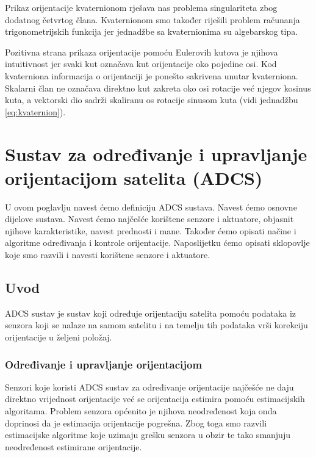 \documentclass[times, utf8, diplomski, numeric]{templates/template}
\begin{document}
{{        Prikaz orijentacije kvaternionom rješava nas problema singulariteta zbog dodatnog četvrtog člana. Kvaternionom smo također riješili problem računanja trigonometrijskih funkcija jer jednadžbe sa kvaternionima su algebarskog tipa.

        Pozitivna strana prikaza orijentacije pomoću Eulerovih kutova je njihova intuitivnost jer svaki kut označava kut orijentacije oko pojedine osi. Kod kvaterniona informacija o orijentaciji je ponešto sakrivena unutar kvaterniona. Skalarni član ne označava direktno kut zakreta oko osi rotacije već njegov kosinus kuta, a vektorski dio sadrži skaliranu os rotacije sinusom kuta (vidi jednadžbu \ref{eq:kvaternion}).
    }
}

\chapter{Sustav za određivanje i upravljanje orijentacijom satelita (ADCS)}{
    U ovom poglavlju navest ćemo definiciju ADCS  sustava. Navest ćemo osnovne dijelove sustava. Navest ćemo najčešće korištene senzore i aktuatore, objasnit njihove karakteristike, navest prednosti i mane. Također ćemo opisati načine i algoritme određivanja i kontrole orijentacije. Naposlijetku ćemo opisati sklopovlje koje smo razvili i navesti korištene senzore i aktuatore. 

    \section{Uvod}{
        ADCS  sustav je sustav koji određuje orijentaciju satelita pomoću podataka iz senzora koji se nalaze na samom satelitu i na temelju tih podataka vrši korekciju orijentacije u željeni položaj. 

        \subsection{Određivanje i upravljanje orijentacijom}{
            Senzori koje koristi ADCS sustav za određivanje orijentacije najčešće ne daju direktno vrijednost orijentacije već se orijentacija estimira pomoću estimacijskih algoritama. Problem senzora općenito je njihova neodređenost koja onda doprinosi da je estimacija orijentacije pogrešna. Zbog toga smo razvili estimacijske algoritme koje uzimaju grešku senzora u obzir te tako smanjuju neodređenost estimirane orijentacije.

}}}
\end{document}
